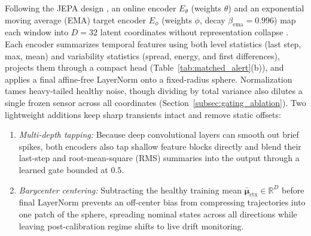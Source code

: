 Following the JEPA design \cite{lecun2022path}, an online encoder $E_\theta$ (weights $\theta$) and an exponential moving average (EMA) target encoder $E_\phi$ (weights $\phi$, decay $\beta_{\text{ema}}=0.996$) map each window into $D=32$ latent coordinates without representation collapse \cite{grill2020bootstrap, assran2023self}. Each encoder summarizes temporal features using both level statistics (last step, max, mean) and variability statistics (spread, energy, and first differences), projects them through a compact head (Table~\ref{tab:matched_alert}(b)), and applies a final affine-free LayerNorm onto a fixed-radius sphere. Normalization tames heavy-tailed healthy noise, though dividing by total variance also dilutes a single frozen sensor across all coordinates (Section~\ref{subsec:gating_ablation}). Two lightweight additions keep sharp transients intact and remove static offsets:
\begin{enumerate}[leftmargin=*,nosep,itemsep=1pt]
    \item \emph{Multi-depth tapping:} Because deep convolutional layers can smooth out brief spikes, both encoders also tap shallow feature blocks directly and blend their last-step and root-mean-square (RMS) summaries into the output through a learned gate bounded at $0.5$.
    \item \emph{Barycenter centering:} Subtracting the healthy training mean $\bar{\bm{\mu}}_{\text{ctx}} \in \mathbb{R}^D$ before final LayerNorm prevents an off-center bias from compressing trajectories into one patch of the sphere, spreading nominal states across all directions while leaving post-calibration regime shifts to live drift monitoring.
\end{enumerate}

